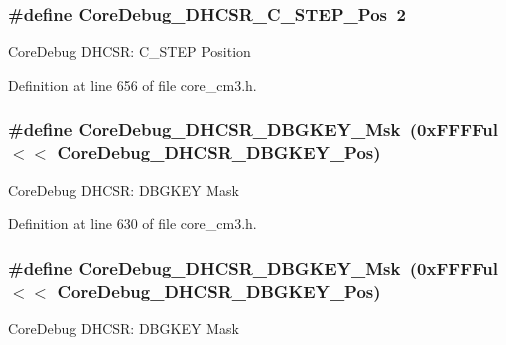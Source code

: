 \subsubsection[{\texorpdfstring{Core\+Debug\+\_\+\+D\+H\+C\+S\+R\+\_\+\+C\+\_\+\+S\+T\+E\+P\+\_\+\+Pos}{CoreDebug_DHCSR_C_STEP_Pos}}]{\setlength{\rightskip}{0pt plus 5cm}\#define Core\+Debug\+\_\+\+D\+H\+C\+S\+R\+\_\+\+C\+\_\+\+S\+T\+E\+P\+\_\+\+Pos~2}\hypertarget{group___c_m_s_i_s___c_m3___core_debug_gae1fc39e80de54c0339cbb1b298a9f0f9}{}\label{group___c_m_s_i_s___c_m3___core_debug_gae1fc39e80de54c0339cbb1b298a9f0f9}
Core\+Debug D\+H\+C\+SR\+: C\+\_\+\+S\+T\+EP Position 

Definition at line 656 of file core\+\_\+cm3.\+h.

\subsubsection[{\texorpdfstring{Core\+Debug\+\_\+\+D\+H\+C\+S\+R\+\_\+\+D\+B\+G\+K\+E\+Y\+\_\+\+Msk}{CoreDebug_DHCSR_DBGKEY_Msk}}]{\setlength{\rightskip}{0pt plus 5cm}\#define Core\+Debug\+\_\+\+D\+H\+C\+S\+R\+\_\+\+D\+B\+G\+K\+E\+Y\+\_\+\+Msk~(0x\+F\+F\+F\+Ful $<$$<$ Core\+Debug\+\_\+\+D\+H\+C\+S\+R\+\_\+\+D\+B\+G\+K\+E\+Y\+\_\+\+Pos)}\hypertarget{group___c_m_s_i_s___c_m3___core_debug_ga1ce997cee15edaafe4aed77751816ffc}{}\label{group___c_m_s_i_s___c_m3___core_debug_ga1ce997cee15edaafe4aed77751816ffc}
Core\+Debug D\+H\+C\+SR\+: D\+B\+G\+K\+EY Mask 

Definition at line 630 of file core\+\_\+cm3.\+h.

\subsubsection[{\texorpdfstring{Core\+Debug\+\_\+\+D\+H\+C\+S\+R\+\_\+\+D\+B\+G\+K\+E\+Y\+\_\+\+Msk}{CoreDebug_DHCSR_DBGKEY_Msk}}]{\setlength{\rightskip}{0pt plus 5cm}\#define Core\+Debug\+\_\+\+D\+H\+C\+S\+R\+\_\+\+D\+B\+G\+K\+E\+Y\+\_\+\+Msk~(0x\+F\+F\+F\+Ful $<$$<$ Core\+Debug\+\_\+\+D\+H\+C\+S\+R\+\_\+\+D\+B\+G\+K\+E\+Y\+\_\+\+Pos)}\hypertarget{group___c_m_s_i_s___c_m3___core_debug_ga1ce997cee15edaafe4aed77751816ffc}{}\label{group___c_m_s_i_s___c_m3___core_debug_ga1ce997cee15edaafe4aed77751816ffc}
Core\+Debug D\+H\+C\+SR\+: D\+B\+G\+K\+EY Mask 

